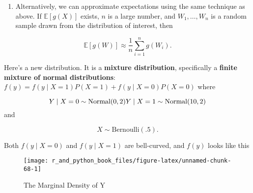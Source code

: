 \documentclass[12pt,krantz2]{krantz}
\providecommand{\tightlist}{%
  \setlength{\itemsep}{0pt}\setlength{\parskip}{0pt}}
\begin{document}
\begin{enumerate}
\def\labelenumi{\arabic{enumi}.}
\setcounter{enumi}{6}
\tightlist
\item
  Alternatively, we can approximate expectations using the same technique as above. If \(\mathbb{E}[g(X)]\) exists, \(n\) is a large number, and \(W_1, \ldots, W_n\) is a random sample drawn from the distribution of interest, then
\end{enumerate}

\begin{equation} 
\mathbb{E}[g(W)] \approx \frac{1}{n}\sum_{i=1}^n g(W_i).
\end{equation}

Here's a new distribution. It is a \textbf{mixture distribution}, specifically a \textbf{finite mixture of normal distributions}: \(f(y) = f(y \mid X=1)P(X=1) + f(y \mid X=0)P(X=0)\) where

\begin{equation} 
Y \mid X=0 \sim \text{Normal}(0, 2) \\
Y \mid X=1 \sim \text{Normal}(10, 2)
\end{equation}
and

\begin{equation} 
X \sim \text{Bernoulli}(.5).
\end{equation}

Both \(f(y \mid X=0)\) and \(f(y \mid X=1)\) are bell-curved, and \(f(y)\) looks like this

\begin{figure}

{\centering \texttt{[image: r\_and\_python\_book\_files/figure-latex/unnamed-chunk-68-1]} 

}

\caption{The Marginal Density of Y}\label{fig:unnamed-chunk-68}
\end{figure}
\end{document}
